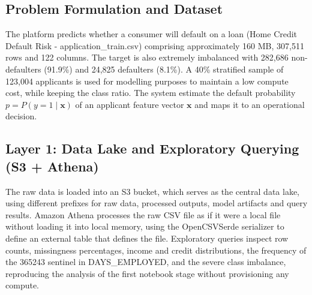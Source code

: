 \documentclass[conference]{IEEEtran}
\begin{document}
\subsection{Problem Formulation and Dataset}
The platform predicts whether a consumer will default on a loan (Home Credit Default Risk - application\_train.csv) comprising approximately 160 MB, 307,511 rows and 122 columns. The target is also extremely imbalanced with 282,686 non-defaulters (91.9\%) and 24,825 defaulters (8.1\%). A 40\% stratified sample of 123,004 applicants is used for modelling purposes to maintain a low compute cost, while keeping the class ratio. The system estimate the default probability $p = P(y=1 \mid \mathbf{x})$ of an applicant feature vector $\mathbf{x}$ and maps it to an operational decision.

\subsection{Layer 1: Data Lake and Exploratory Querying (S3 + Athena)}
The raw data is loaded into an S3 bucket, which serves as the central data lake, using different prefixes for raw data, processed outputs, model artifacts and query results. Amazon Athena processes the raw CSV file as if it were a local file without loading it into local memory, using the OpenCSVSerde serializer to define an external table that defines the file. Exploratory queries inspect row counts, missingness percentages, income and credit distributions, the frequency of the 365243 sentinel in DAYS\_EMPLOYED, and the severe class imbalance, reproducing the analysis of the first notebook stage without provisioning any compute.
\end{document}

